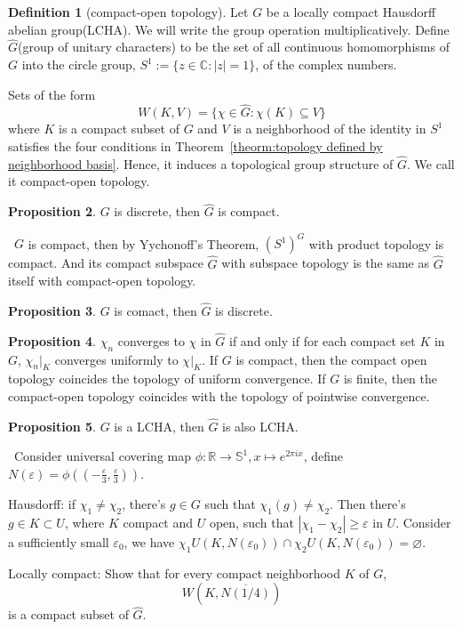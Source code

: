 \documentclass[12pt,a4paper]{book}
\newenvironment{prooff}{{\noindent\it\textcolor{cyan!40!black}{Proof}:}\,}{\par}
\newcommand{\bb}[1]{\mathbb{#1}}
\theoremstyle{definition}
\newtheorem{defn}{Definition}[section]
\newtheorem{prop}[defn]{Proposition}
\begin{document}
\begin{defn}[compact-open topology]
    Let $G$ be a locally compact Hausdorff abelian group(LCHA). We will write
    the group operation multiplicatively. Define $\hat{G}$(group of unitary characters)
    to be the set of all continuous homomorphisms of $G$ into the circle group, $S^1:=\{z \in \mathbb{C}:|z|=1\}$, of the complex numbers.

    Sets of the form
    $$
        W(K, V)=\{\chi \in \hat{G}: \chi(K) \subseteq V\}
    $$
    where $K$ is a compact subset of $G$ and $V$ is a neighborhood of
    the identity in $S^1$ satisfies the four conditions in Theorem~\ref{theorm:topology defined by neighborhood basis}. Hence, it induces a
    topological group structure of $\hat{G}$. We call it compact-open topology.
\end{defn}
\begin{prop}
    $G$ is discrete, then $\hat{G}$ is compact.
\end{prop}
\begin{prooff}
    $G$ is compact, then by Yychonoff's Theorem, $(S^1)^G$ with product topology is compact. And its compact subspace
    $\hat{G}$ with subspace topology is the same as $\hat{G}$ itself with compact-open topology.
\end{prooff}
\begin{prop}
    $G$ is comact, then $\hat{G}$ is discrete.
\end{prop}
\begin{prop}
    $\chi_n$ converges to $\chi$ in $\hat{G}$ if and only if for each compact set $K$ in $G$, $\chi_n|_K$ converges uniformly to $\chi|_K$.
    If $G$ is compact, then the compact open topology coincides the topology of uniform convergence. If $G$ is finite, then the compact-open topology coincides with the topology of pointwise convergence.
\end{prop}
\begin{prop}
    $G$ is a LCHA, then $\hat{G}$ is also LCHA.
\end{prop}
\begin{prooff}
    Consider universal covering map $\phi:\bb{R}\rightarrow \bb{S}^1, x\mapsto e^{2\pi ix}$, define $N(\varepsilon)=\phi((-\frac{\varepsilon}{3},\frac{\varepsilon}{3}))$.

    Hausdorff: if $\chi_1\neq \chi_2$, there's $g\in G$ such that $\chi_1(g)\neq \chi_2$. Then there's $g\in K\subset U$, where $K$ compact and $U$ open, such that $|\chi_1-\chi_2|\ge \varepsilon$ in $U$.
    Consider a sufficiently small $\varepsilon_0$, we have $\chi_1 U(K,N(\varepsilon_0))\cap \chi_2 U(K,N(\varepsilon_0))=\varnothing$.

    Locally compact: Show that for every compact neighborhood $K$ of $G$,
    \begin{equation*}
        W(K,\overline{N(1/4)})
    \end{equation*}
    is a compact subset of $\hat{G}$.
\end{prooff}
\end{document}
